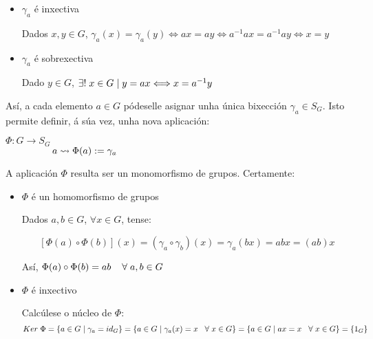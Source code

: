 \documentclass[twoside]{report}
\theoremstyle{mystyle}
\begin{document}
\begin{itemize}
    
    \item $\gamma_{a}$ é inxectiva
    
    Dados $x,y \in G$, $\gamma_{a}(x) = \gamma_{a}(y) \Longleftrightarrow ax = ay \Longleftrightarrow a^{-1}ax = a^{-1}ay \Longleftrightarrow x = y$
    
    \item $\gamma_{a}$ é sobrexectiva
    
    Dado $y \in G$, $\exists! \hspace{1mm} x \in G \hspace{1mm} | \hspace{1mm} y = ax \Longleftrightarrow x = a^{-1}y$
    
\end{itemize}

\noindent Así, a cada elemento $a \in G$ pódeselle asignar unha única bixección $\gamma_{a} \in S_{G}$. Isto permite definir, á súa vez, unha nova aplicación: \\

    \begin{center}
            $\Phi: G \longrightarrow S_{G}$ \\
        \vspace{2mm}
        $\hspace{17mm} a \leadsto \Phi(a) := \gamma_{a}$
    \end{center} 
    
\noindent A aplicación $\Phi$ resulta ser un monomorfismo de grupos. Certamente:

\begin{itemize}
    
    \item $\Phi$ é un homomorfismo de grupos
    
    Dados $a,b \in G$, $\forall x \in G$, tense: 
    
    $$[\Phi(a) \circ \Phi(b)](x) = (\gamma_{a} \circ \gamma_{b})(x) = \gamma_{a}(bx) = abx = (ab)x$$
    
    Así, $\Phi(a) \circ \Phi(b) = ab \hspace{4mm} \forall \hspace{1mm} a,b \in G$
    
    \item $\Phi$ é inxectivo
    
    Calcúlese o núcleo de $\Phi$:
    $$Ker \hspace{1mm} \Phi = \{ a \in G \hspace{1mm} | \hspace{1mm} \gamma_{a} = id_{G} \} = \{ a \in G \hspace{1mm} | \hspace{1mm} \gamma_{a}(x) = x \hspace{3mm} \forall \hspace{1mm} x \in G \} = \{ a \in G \hspace{1mm} | \hspace{1mm} ax = x \hspace{3mm} \forall \hspace{1mm} x \in G \} = \{1_{G}\}$$
    
\end{itemize}
\end{document}
